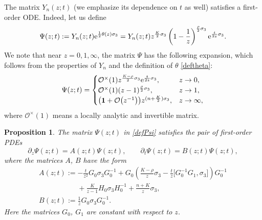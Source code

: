 \documentclass[pdftex]{sigma}
\numberwithin{equation}{section}
\newtheorem{Proposition}[Theorem]{Proposition}
\theoremstyle{definition}
\def\le{\left}
\def\ri{\right}
\def\be{\begin{equation}}
\def\ee{\end{equation}}
\def \1{\mathbf 1}
\def\s{\sigma}
\def\pa{\partial}
\begin{document}
The matrix $Y_n(z;t)$ (we emphasize its dependence on $t$ as well) satisfies a first-order ODE. Indeed, let us define
\be
\Psi(z;t):= Y_n(z;t) {\rm e}^{\frac 1 2 \theta(z) \s_3} =
 Y_n(z;t) z^{\frac{{ {K}}}2\s_3}
 \le(1- \frac 1 z\ri)^{\frac{{ {\rho}}}2\s_3} {\rm e}^{\frac t{2z} \s_3}.
\label{defPsi}
\ee
We note that near $z=0,1,\infty$, the matrix $\Psi$ has the following expansion, which follows from the properties of $Y_n$ and the definition of $\theta$ \eqref{deftheta}:
\be
\Psi(z;t) =
\begin{cases}
{\mathcal O}^\times(1) z^{\frac {{ {K}}-{ {\rho}}}2\s_3} {\rm e}^{\frac t {2z}\s_3},& z\to 0,\\
{\mathcal O}^\times(1) (z-1)^{\frac {{ {\rho}}}2\s_3}, & z\to 1,\\
\bigl(\1 + \mathcal O\bigl(z^{-1}\bigr) \bigr) z^{ (n+ \frac { {K}} 2)\s_3}, & z\to \infty,
\end{cases}
\label{Psiasy}
\ee
where $\mathcal O^\times(1)$ means a locally analytic and invertible matrix.
\begin{Proposition}
The matrix $\Psi(z;t)$ in \eqref{defPsi} satisfies the pair of first-order PDEs
\be
\label{Laxour}
\pa_z \Psi(z;t) = A(z;t) \Psi(z;t),\qquad
\pa_t \Psi(z;t) = B(z;t) \Psi(z;t),
\ee
where the matrices $A$, $B$ have the form
\begin{gather*}
A(z;t):= -\frac t {z^2} G_0 \s_3 G_0^{-1} + G_0\le(\frac{{ {K}}-{ {\rho}}}z\s_3 - \frac t z \big[G_0^{-1}G_1, \s_3\big]\ri) G_0^{-1} \\
\phantom{A(z;t):=}{}+\frac {{ {K}}}{z-1} H_0 \s_3 H_0^{-1} + \frac{n+{ {K}}}z \s_3,
\\
B(z;t):= \frac 1 {z} G_0 \s_3 G_0^{-1}.
\end{gather*}
Here the matrices $G_0$, $G_1$ are constant with respect to $z$.
\end{Proposition}
\end{document}
